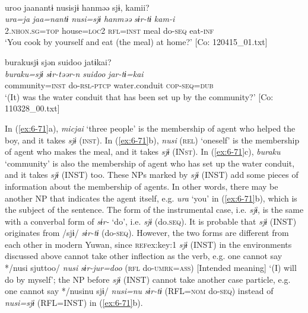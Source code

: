 \ex{}\\
{\TM}
\glll  uroo  jaanantɨ  nusisjɨ  hanməə  sjɨ,  kamii?\\
\textit{ura=ja}  \textit{jaa=nantɨ}  \textit{nusi=sjɨ}  \textit{hanməə}  \textit{sɨr-tɨ}  \textit{kam-i}\\
2.\textsc{nhon}.\textsc{sg}=\textsc{top}  house=\textsc{loc2}  \textsc{rfl}=\textsc{inst}  meal  do-\textsc{seq}  eat-\textsc{inf}\\
\glt ‘You cook by yourself and eat (the meal) at home?’ [Co: 120415\_01.txt]

\ex
{\TM}
\glll burakusjɨ  sjən  {\textbar}suidoo{\textbar}  jatɨkai?\\
\textit{buraku=sjɨ}  \textit{sɨr-təər-n}  \textit{suidoo}  \textit{jar-tɨ=kai}\\
community=\textsc{inst}  do-\textsc{rsl}-\textsc{ptcp}  water.conduit  \textsc{cop}-\textsc{seq}=\textsc{dub}\\
\glt ‘(It) was the water conduit that has been set up by the community?’ [Co: 110328\_00.txt]
\z
\z

In (\ref{ex:6-71}a), \textit{micjai} ‘three people’ is the membership of agent who helped the boy, and it takes \textit{sjɨ} (\textsc{inst}). In (\ref{ex:6-71}b), \textit{nusi} (\textsc{rel}) ‘oneself’ is the membership of agent who makes the meal, and it takes \textit{sjɨ} (IN\textsc{st}). In (\ref{ex:6-71}c), \textit{buraku} ‘community’ is also the membership of agent who has set up the water conduit, and it takes \textit{sjɨ} (INST) too. These NPs marked by \textit{sjɨ} (INST) add some pieces of information about the membership of agents. In other words, there may be another NP that indicates the agent itself, e.g. \textit{ura} ‘you’ in (\ref{ex:6-71}b), which is the subject of the sentence. The form of the instrumental case, i.e. \textit{sjɨ}, is the same with a converbal form of \textit{sɨr-} ‘do’, i.e. \textit{sjɨ} (do.\textsc{seq}). It is probable that \textit{sjɨ} (INST) originates from /sjɨ/ \textit{sɨr-tɨ} (do-\textsc{seq}). However, the two forms are different from each other in modern Yuwan, since \textsc{ref}{ex:key:1} \textit{sjɨ} (INST) in the environments discussed above cannot take other inflection as the verb, e.g. one cannot say */nusi sjuttoo/ \textit{nusi} \textit{sɨr-jur=doo} (\textsc{rfl} do-\textsc{umrk}=\textsc{ass}) [Intended meaning] ‘(I) will do by myself’;  the NP before \textit{sjɨ} (INST) cannot take another case particle, e.g. one cannot say */nusinu sjɨ/ \textit{nusi=nu} \textit{sɨr-tɨ} (RFL=\textsc{nom} do-\textsc{seq}) instead of \textit{nusi=sjɨ} (RFL=INST) in (\ref{ex:6-71}b).

